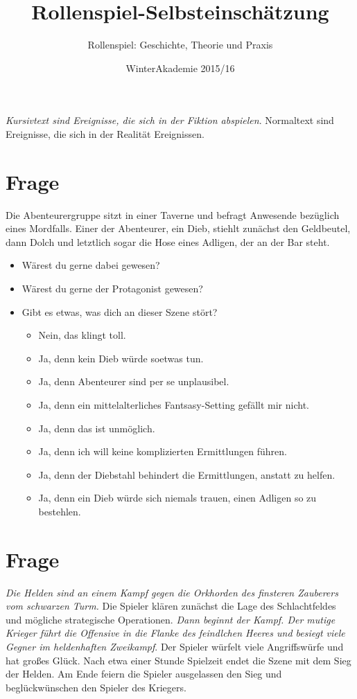 \documentclass{article}
\title{Rollenspiel-Selbsteinschätzung}
\author{Rollenspiel: Geschichte, Theorie und Praxis}
\date{WinterAkademie 2015/16}
\newcommand\frage[1]{\section{Frage}\label{#1}}
\begin{document}
\maketitle

\textit{Kursivtext sind Ereignisse, die sich in der Fiktion abspielen}. Normaltext sind Ereignisse, die sich in der Realität Ereignissen.

\frage{hosendiebstahl}
Die Abenteurergruppe sitzt in einer Taverne und befragt Anwesende
bezüglich eines Mordfalls. Einer der Abenteurer, ein Dieb, stiehlt
zunächst den Geldbeutel, dann  Dolch und letztlich sogar die Hose
eines Adligen, der an der Bar steht.

\begin{itemize}
\item  Wärest du gerne dabei gewesen?
\item  Wärest du gerne der Protagonist gewesen?
\item  Gibt es etwas, was dich an dieser Szene stört?
  \begin{itemize}
  \item Nein, das klingt toll.
  \item Ja, denn kein Dieb würde soetwas tun.
  \item Ja, denn Abenteurer sind per se unplausibel.
  \item Ja, denn ein mittelalterliches Fantsasy-Setting gefällt mir nicht.
  \item Ja, denn das ist unmöglich.
  \item Ja, denn ich will keine komplizierten Ermittlungen führen.
  \item Ja, denn der Diebstahl behindert die Ermittlungen, anstatt zu helfen.
  \item Ja, denn ein Dieb würde sich niemals trauen, einen Adligen so zu bestehlen.
  \end{itemize}
\end{itemize}

\frage{schlachtengetuemmel}
\textit{Die Helden sind an einem Kampf gegen die Orkhorden des
  finsteren Zauberers vom schwarzen Turm.} Die Spieler klären zunächst
die Lage des Schlachtfeldes und mögliche strategische
Operationen. \textit{Dann beginnt der Kampf. Der mutige Krieger führt
  die Offensive in die Flanke des feindlchen Heeres und besiegt viele
  Gegner im heldenhaften Zweikampf}. Der Spieler würfelt viele
Angriffswürfe und hat großes Glück. Nach etwa einer Stunde Spielzeit
endet die Szene mit dem Sieg der Helden. Am Ende feiern die Spieler
ausgelassen den Sieg und beglückwünschen den Spieler des Kriegers.
\end{document}
